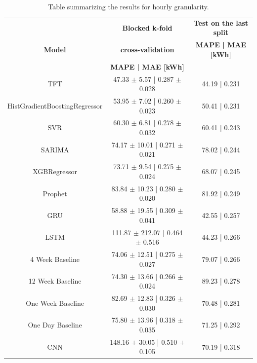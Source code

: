 \begin{table}[H]
\centering
\begin{tabular}{|c|c|c|}
\hline
 & \textbf{Blocked k-fold} & \textbf{Test on the last split}\\
\textbf{Model} & \textbf{cross-validation} & \textbf{MAPE | MAE [kWh]}\\
 & \textbf{MAPE | MAE [kWh]} & \\
\hline
TFT & 47.33 $\pm$ 5.57 | 0.287 $\pm$ 0.028 & 44.19 | 0.231\\
\hline
HistGradientBoostingRegressor & 53.95 $\pm$ 7.02 | 0.260 $\pm$ 0.023 & 50.41 | 0.231\\
\hline
SVR & 60.30 $\pm$ 6.81 | 0.278 $\pm$ 0.032 & 60.41 | 0.243\\
\hline
SARIMA & 74.17 $\pm$ 10.01 | 0.271 $\pm$ 0.021 & 78.02 | 0.244\\
\hline
XGBRegressor & 73.71 $\pm$ 9.54 | 0.275 $\pm$ 0.024 & 68.07 | 0.245\\
\hline
Prophet & 83.84 $\pm$ 10.23 | 0.280 $\pm$ 0.020 & 81.92 | 0.249\\
\hline
GRU & 58.88 $\pm$ 19.55 | 0.309 $\pm$ 0.041 & 42.55 | 0.257\\
\hline
LSTM & 111.87 $\pm$ 212.07 | 0.464 $\pm$ 0.516 & 44.23 | 0.266\\
\hline
4 Week Baseline & 74.06 $\pm$ 12.51 | 0.275 $\pm$ 0.027 & 79.07 | 0.266\\
\hline
12 Week Baseline & 74.30 $\pm$ 13.66 | 0.266 $\pm$ 0.024 & 89.23 | 0.278\\
\hline
One Week Baseline & 82.69 $\pm$ 12.83 | 0.326 $\pm$ 0.030 & 70.48 | 0.281\\
\hline
One Day Baseline & 75.80 $\pm$ 13.96 | 0.318 $\pm$ 0.035 & 71.25 | 0.292\\
\hline
CNN & 148.16 $\pm$ 30.05 | 0.510 $\pm$ 0.105 & 70.19 | 0.318\\
\hline
\end{tabular}
\caption{Table summarizing the results for hourly granularity.}
\label{tab:baselinehourlyresults}
\end{table}

